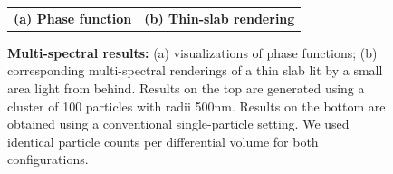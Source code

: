 \begin{figure}
\begin{tabular}{cc}
        \\
        \textbf{(a) Phase function} & \textbf{(b) Thin-slab rendering}
    \end{tabular}
    \caption{\label{fig:multiwave1}
        \textbf{Multi-spectral results:} (a) visualizations of phase functions; (b) corresponding multi-spectral renderings of a thin slab lit by a small area light from behind.
        Results on the top are generated using a cluster of 100 particles with radii 500nm.
        Results on the bottom are obtained using a conventional single-particle setting.
        We used identical particle counts per differential volume for both configurations.
    }
\end{figure}
